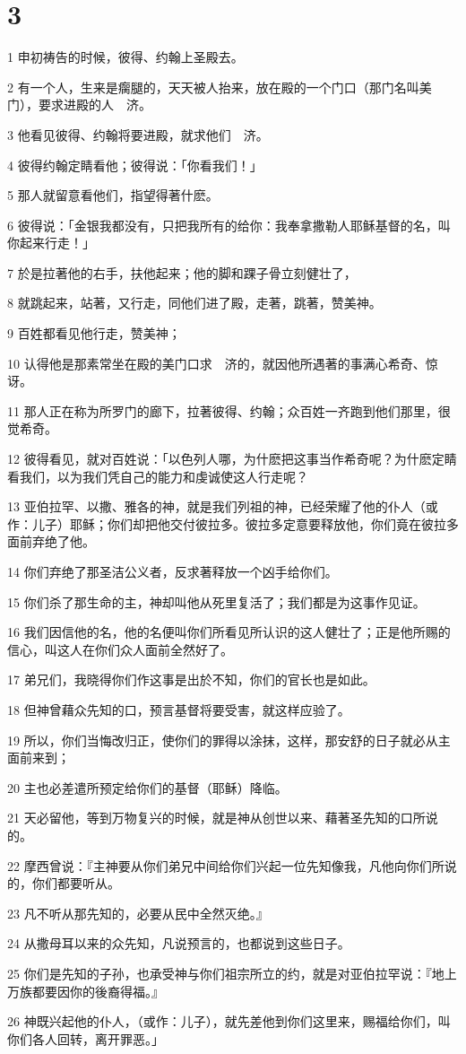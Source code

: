 \chapter{3}

\par 1 申初祷告的时候，彼得、约翰上圣殿去。
\par 2 有一个人，生来是瘸腿的，天天被人抬来，放在殿的一个门口（那门名叫美门），要求进殿的人　济。
\par 3 他看见彼得、约翰将要进殿，就求他们　济。
\par 4 彼得约翰定睛看他；彼得说：「你看我们！」
\par 5 那人就留意看他们，指望得著什麽。
\par 6 彼得说：「金银我都没有，只把我所有的给你：我奉拿撒勒人耶稣基督的名，叫你起来行走！」
\par 7 於是拉著他的右手，扶他起来；他的脚和踝子骨立刻健壮了，
\par 8 就跳起来，站著，又行走，同他们进了殿，走著，跳著，赞美神。
\par 9 百姓都看见他行走，赞美神；
\par 10 认得他是那素常坐在殿的美门口求　济的，就因他所遇著的事满心希奇、惊讶。
\par 11 那人正在称为所罗门的廊下，拉著彼得、约翰；众百姓一齐跑到他们那里，很觉希奇。
\par 12 彼得看见，就对百姓说：「以色列人哪，为什麽把这事当作希奇呢？为什麽定睛看我们，以为我们凭自己的能力和虔诚使这人行走呢？
\par 13 亚伯拉罕、以撒、雅各的神，就是我们列祖的神，已经荣耀了他的仆人（或作：儿子）耶稣；你们却把他交付彼拉多。彼拉多定意要释放他，你们竟在彼拉多面前弃绝了他。
\par 14 你们弃绝了那圣洁公义者，反求著释放一个凶手给你们。
\par 15 你们杀了那生命的主，神却叫他从死里复活了；我们都是为这事作见证。
\par 16 我们因信他的名，他的名便叫你们所看见所认识的这人健壮了；正是他所赐的信心，叫这人在你们众人面前全然好了。
\par 17 弟兄们，我晓得你们作这事是出於不知，你们的官长也是如此。
\par 18 但神曾藉众先知的口，预言基督将要受害，就这样应验了。
\par 19 所以，你们当悔改归正，使你们的罪得以涂抹，这样，那安舒的日子就必从主面前来到；
\par 20 主也必差遣所预定给你们的基督（耶稣）降临。
\par 21 天必留他，等到万物复兴的时候，就是神从创世以来、藉著圣先知的口所说的。
\par 22 摩西曾说：『主神要从你们弟兄中间给你们兴起一位先知像我，凡他向你们所说的，你们都要听从。
\par 23 凡不听从那先知的，必要从民中全然灭绝。』
\par 24 从撒母耳以来的众先知，凡说预言的，也都说到这些日子。
\par 25 你们是先知的子孙，也承受神与你们祖宗所立的约，就是对亚伯拉罕说：『地上万族都要因你的後裔得福。』
\par 26 神既兴起他的仆人，（或作：儿子），就先差他到你们这里来，赐福给你们，叫你们各人回转，离开罪恶。」

